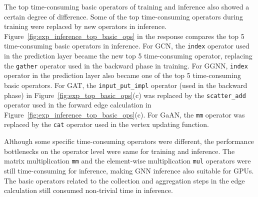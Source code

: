 The top time-consuming basic operators of training and inference also showed a certain degree of difference.
%
Some of the top time-consuming operators during training were replaced by new operators in inference.
%
Figure~\ref{fig:exp_inference_top_basic_ops} in the response compares the top 5 time-consuming basic operators in inference.
%
For GCN, the \texttt{index} operator used in the prediction layer became the new top 5 time-consuming operator, replacing the \texttt{gather} operator used in the backward phase in training.
%
%
For GGNN, \texttt{index} operator in the prediction layer also became one of the top 5 time-consuming basic operators.
%
%
For GAT, the \texttt{input\_put\_impl} operator (used in the backward phase) in Figure~\ref{fig:exp_top_basic_ops}(c) was replaced by the \texttt{scatter\_add} operator used in the forward edge calculation in Figure~\ref{fig:exp_inference_top_basic_ops}(c).
%
%
For GaAN, the \texttt{mm} operator was replaced by the \texttt{cat} operator used in the vertex updating function.

Although some specific time-consuming operators were different, the performance bottlenecks on the operator level were same for training and inference.
%
The matrix multiplication \texttt{mm} and the element-wise multiplication \texttt{mul} operators were still time-consuming for inference, making GNN inference also {suitable for GPUs}.
%
The basic operators related to the collection and aggregation steps in the edge calculation still consumed non-trivial time in inference.

